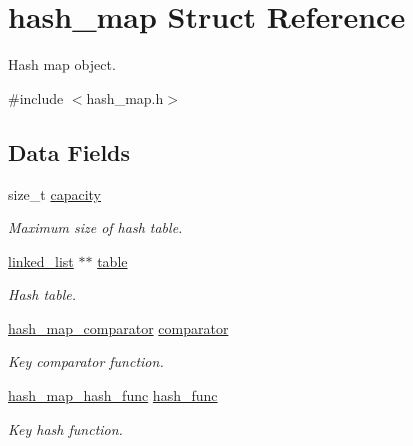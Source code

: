 \hypertarget{structhash__map}{\section{hash\-\_\-map Struct Reference}
\label{structhash__map}
}


Hash map object.  




{\ttfamily \#include $<$hash\-\_\-map.\-h$>$}

\subsection*{Data Fields}
\begin{DoxyCompactItemize}
\item 
\hypertarget{structhash__map_ae90f824948b83c662840b50b76d3e9d9}{size\-\_\-t \hyperlink{structhash__map_ae90f824948b83c662840b50b76d3e9d9}{capacity}}\label{structhash__map_ae90f824948b83c662840b50b76d3e9d9}

\begin{DoxyCompactList}\small\item\em Maximum size of hash table. \end{DoxyCompactList}\item 
\hypertarget{structhash__map_ab667082c703a98eb7e6db21dd4ad4696}{\hyperlink{structlinked__list}{linked\-\_\-list} $\ast$$\ast$ \hyperlink{structhash__map_ab667082c703a98eb7e6db21dd4ad4696}{table}}\label{structhash__map_ab667082c703a98eb7e6db21dd4ad4696}

\begin{DoxyCompactList}\small\item\em Hash table. \end{DoxyCompactList}\item 
\hypertarget{structhash__map_a43f57a3e49d240f8cb0aeb1666992fbb}{\hyperlink{hash__map_8h_a9b3733ab5963e04230bbc06ac9a0049c}{hash\-\_\-map\-\_\-comparator} \hyperlink{structhash__map_a43f57a3e49d240f8cb0aeb1666992fbb}{comparator}}\label{structhash__map_a43f57a3e49d240f8cb0aeb1666992fbb}

\begin{DoxyCompactList}\small\item\em Key comparator function. \end{DoxyCompactList}\item 
\hypertarget{structhash__map_a2a93ecf7b93a2023a5ed59973612f207}{\hyperlink{hash__map_8h_a21a2d0b47caed184ebeb9ab21fe4e4b2}{hash\-\_\-map\-\_\-hash\-\_\-func} \hyperlink{structhash__map_a2a93ecf7b93a2023a5ed59973612f207}{hash\-\_\-func}}\label{structhash__map_a2a93ecf7b93a2023a5ed59973612f207}

\begin{DoxyCompactList}\small\item\em Key hash function. \end{DoxyCompactList}\end{DoxyCompactItemize}


